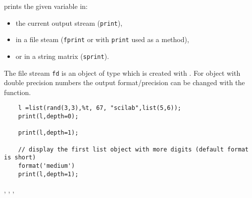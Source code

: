 \begin{mandescription}
  prints the given variable in:
\begin{itemize}
\item the current output stream (\verb+print+), 
\item in a file steam (\verb+fprint+ or with \verb+print+ used as a method),
\item or in a string matrix (\verb+sprint+).
\end{itemize}
The file stream \verb+fd+ is an object of type  which 
is created with . For object with double precision numbers
the output format/precision can be changed with the  function. 
\end{mandescription}
\begin{examples}
  \begin{Verbatim}
    l =list(rand(3,3),%t, 67, "scilab",list(5,6));
    print(l,depth=0);

    print(l,depth=1);

    // display the first list object with more digits (default format is short)
    format('medium')
    print(l,depth=1);
  \end{Verbatim}
\end{examples}
\begin{manseealso}
  , , , 
\end{manseealso}

